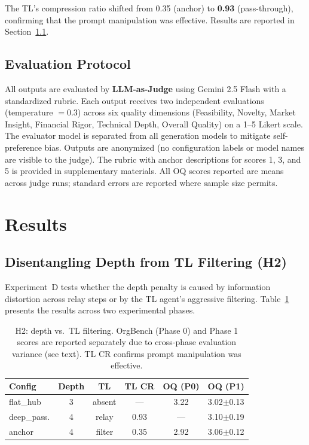 \documentclass[conference]{IEEEtran}
\begin{document}
The TL's compression ratio shifted from 0.35 (anchor) to \textbf{0.93} (pass-through), confirming that the prompt manipulation was effective.
Results are reported in Section~\ref{subsec:h2_result}.

\subsection{Evaluation Protocol}

All outputs are evaluated by \textbf{LLM-as-Judge} using Gemini 2.5 Flash with a standardized rubric.
Each output receives two independent evaluations (temperature $= 0.3$) across six quality dimensions (Feasibility, Novelty, Market Insight, Financial Rigor, Technical Depth, Overall Quality) on a 1--5 Likert scale.
The evaluator model is separated from all generation models to mitigate self-preference bias.
Outputs are anonymized (no configuration labels or model names are visible to the judge).
The rubric with anchor descriptions for scores 1, 3, and 5 is provided in supplementary materials.
All OQ scores reported are means across judge runs; standard errors are reported where sample size permits.


\section{Results}
\label{sec:results}

\subsection{Disentangling Depth from TL Filtering (H2)}
\label{subsec:h2_result}

Experiment~D tests whether the depth penalty is caused by information distortion across relay steps or by the TL agent's aggressive filtering.
Table~\ref{tab:h2} presents the results across two experimental phases.

\begin{table}[t]
\centering
\caption{H2: depth vs.\ TL filtering. OrgBench (Phase 0) and Phase 1 scores are reported separately due to cross-phase evaluation variance (see text). TL CR confirms prompt manipulation was effective.}
\label{tab:h2}
\small
\begin{tabular}{lccccc}
\toprule
\textbf{Config} & \textbf{Depth} & \textbf{TL} & \textbf{TL CR} & \textbf{OQ (P0)} & \textbf{OQ (P1)} \\
\midrule
flat\_hub & 3 & absent & --- & 3.22 & 3.02$\pm$0.13 \\
deep\_pass. & 4 & relay & 0.93 & --- & 3.10$\pm$0.19 \\
anchor & 4 & filter & 0.35 & 2.92 & 3.06$\pm$0.12 \\
\bottomrule
\end{tabular}
\end{table}
\end{document}
